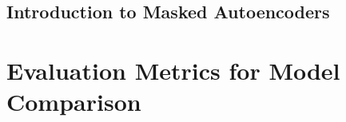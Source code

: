 \subsection{Introduction to Masked Autoencoders}

\section{Evaluation Metrics for Model Comparison}


